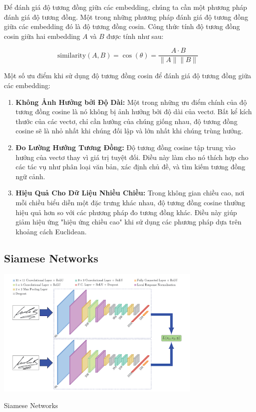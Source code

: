 \documentclass[a4paper, 12pt, openany]{book}
\begin{document}
Để đánh giá độ tương đồng giữa các embedding, chúng ta cần một phương pháp đánh giá độ tương đồng. Một trong những phương pháp đánh giá độ tương đồng giữa các embedding đó là độ tương đồng cosin. Công thức tính độ tương đồng cosin giữa hai embedding $A$ và $B$ được tính như sau:

\begin{equation}
    \text{similarity}(A, B) = \cos(\theta) = \frac{A \cdot B}{\|A\| \|B\|}
\end{equation}

Một số ưu điểm khi sử dụng độ tương đồng cosin để đánh giá độ tương đồng giữa các embedding:
\begin{enumerate}
    \item \textbf{Không Ảnh Hưởng bởi Độ Dài:} Một trong những ưu điểm chính của độ tương đồng cosine là nó không bị ảnh hưởng bởi độ dài của vectơ. Bất kể kích thước của các vectơ, chỉ cần hướng của chúng giống nhau, độ tương đồng cosine sẽ là nhỏ nhất khi chúng đối lập và lớn nhất khi chúng trùng hướng.

    \item \textbf{Đo Lường Hướng Tương Đồng:} Độ tương đồng cosine tập trung vào hướng của vectơ thay vì giá trị tuyệt đối. Điều này làm cho nó thích hợp cho các tác vụ như phân loại văn bản, xác định chủ đề, và tìm kiếm tương đồng ngữ cảnh.

    \item \textbf{Hiệu Quả Cho Dữ Liệu Nhiều Chiều:} Trong không gian chiều cao, nơi mỗi chiều biểu diễn một đặc trưng khác nhau, độ tương đồng cosine thường hiệu quả hơn so với các phương pháp đo tương đồng khác. Điều này giúp giảm hiệu ứng "hiệu ứng chiều cao" khi sử dụng các phương pháp dựa trên khoảng cách Euclidean.
\end{enumerate}

\subsection{Siamese Networks}

\begin{minipage}{\linewidth}
    \captionsetup{type=figure}
    \centering
    \includegraphics[width=10cm]{./assets/images/1_siamese-network.png}
    \caption{Siamese Networks\cite{https://builtin.com/machine-learning/siamese-network}}
\end{minipage} 
\end{document}
